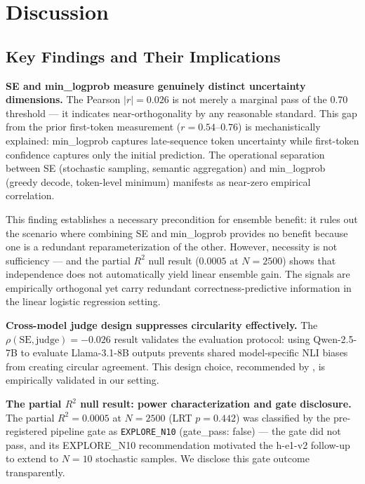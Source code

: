 \section{Discussion}
\label{sec:discussion}

\subsection{Key Findings and Their Implications}

\textbf{SE and min\_logprob measure genuinely distinct uncertainty dimensions.} The Pearson $|r|=0.026$ is not merely a marginal pass of the 0.70 threshold --- it indicates near-orthogonality by any reasonable standard. This gap from the prior first-token measurement ($r=0.54$--$0.76$) is mechanistically explained: min\_logprob captures late-sequence token uncertainty while first-token confidence captures only the initial prediction. The operational separation between SE (stochastic sampling, semantic aggregation) and min\_logprob (greedy decode, token-level minimum) manifests as near-zero empirical correlation.

This finding establishes a necessary precondition for ensemble benefit: it rules out the scenario where combining SE and min\_logprob provides no benefit because one is a redundant reparameterization of the other. However, necessity is not sufficiency --- and the partial $R^2$ null result ($0.0005$ at $N=2500$) shows that independence does not automatically yield linear ensemble gain. The signals are empirically orthogonal yet carry redundant correctness-predictive information in the linear logistic regression setting.

\textbf{Cross-model judge design suppresses circularity effectively.} The $\rho(\text{SE}, \text{judge}) = -0.026$ result validates the evaluation protocol: using Qwen-2.5-7B to evaluate Llama-3.1-8B outputs prevents shared model-specific NLI biases from creating circular agreement. This design choice, recommended by \citet{santilli2025revisiting}, is empirically validated in our setting.

\textbf{The partial $R^2$ null result: power characterization and gate disclosure.} The partial $R^2=0.0005$ at $N=2500$ (LRT $p=0.442$) was classified by the pre-registered pipeline gate as \texttt{EXPLORE\_N10} (gate\_pass: false) --- the gate did not pass, and its EXPLORE\_N10 recommendation motivated the h-e1-v2 follow-up to extend to $N=10$ stochastic samples. We disclose this gate outcome transparently.

